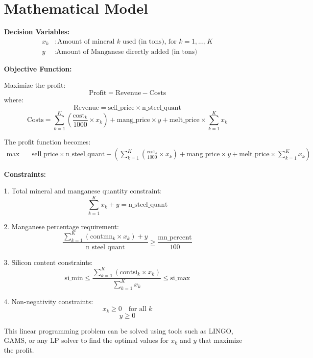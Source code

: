 \documentclass{article}
\begin{document}
\section*{Mathematical Model}

\textbf{Decision Variables:}
\begin{align*}
x_k & : \text{Amount of mineral } k \text{ used (in tons), for } k=1,\ldots,K \\
y & : \text{Amount of Manganese directly added (in tons)}
\end{align*}

\textbf{Objective Function:}

Maximize the profit:
\[
\text{Profit} = \text{Revenue} - \text{Costs}
\]
where:
\[
\text{Revenue} = \text{sell\_price} \times \text{n\_steel\_quant}
\]
\[
\text{Costs} = \sum_{k=1}^{K} \left( \frac{\text{cost}_{k}}{1000} \times x_k \right) + \text{mang\_price} \times y + \text{melt\_price} \times \sum_{k=1}^{K} x_k
\]

The profit function becomes:
\[
\begin{align*}
\max & \quad \text{sell\_price} \times \text{n\_steel\_quant} - \left( \sum_{k=1}^{K} \left( \frac{\text{cost}_{k}}{1000} \times x_k \right) + \text{mang\_price} \times y + \text{melt\_price} \times \sum_{k=1}^{K} x_k \right)
\end{align*}
\]

\textbf{Constraints:}

1. Total mineral and manganese quantity constraint:
\[
\sum_{k=1}^{K} x_k + y = \text{n\_steel\_quant}
\]

2. Manganese percentage requirement:
\[
\frac{\sum_{k=1}^{K} (\text{contmn}_{k} \times x_k) + y}{\text{n\_steel\_quant}} \geq \frac{\text{mn\_percent}}{100}
\]

3. Silicon content constraints:
\[
\text{si\_min} \leq \frac{\sum_{k=1}^{K} (\text{contsi}_{k} \times x_k)}{\sum_{k=1}^{K} x_k} \leq \text{si\_max}
\]

4. Non-negativity constraints:
\[
x_k \geq 0 \quad \text{for all } k
\]
\[
y \geq 0
\]

This linear programming problem can be solved using tools such as LINGO, GAMS, or any LP solver to find the optimal values for \( x_k \) and \( y \) that maximize the profit.
\end{document}
